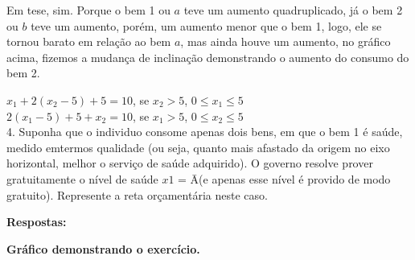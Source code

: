 \begin{flushleft}
\begin{center}
\end{center}

Em tese, sim. Porque o bem 1 ou $\textit{a}$ teve um aumento quadruplicado, já o bem 2 ou $\textit{b}$ teve um aumento, porém, um aumento menor que o bem 1, logo, ele se tornou barato em relação ao bem $\textit{a}$, mas ainda houve um aumento, no gráfico acima, fizemos a mudança de inclinação demonstrando o aumento do consumo do bem 2. \singlespacing

{$x_{1}+2(x_{2}-5)+5=10$}, se {$x_{2}>5$}, {$0\leq$}{$x_{1}$}{$\leq5$}\\
{$2(x_{1}-5)+5+x_{2}=10$}, se {$x_{1}>5$}, {$0\leq$}{$x_{2}$}{$\leq5$}\\



4. Suponha que o individuo consome apenas dois bens, em que o bem 1 é saúde, medido emtermos qualidade (ou seja, quanto mais afastado da origem no eixo horizontal, melhor o serviço de saúde adquirido). O governo resolve prover gratuitamente o nível de saúde $\textit{x1}$ = Ā(e apenas esse nível é provido de modo gratuito). Represente a reta orçamentária neste caso. \singlespacing

\textbf{Respostas:} \singlespacing
\begin{center}
\textbf{Gráfico demonstrando o exercício.} 
\singlespacing
{}
\end{center}
\end{flushleft}
